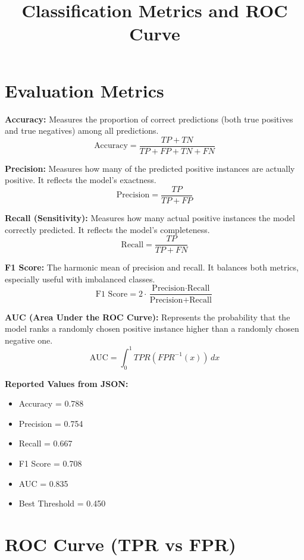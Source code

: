 \documentclass{article}
\title{Classification Metrics and ROC Curve}
\date{}
\begin{document}
\maketitle

\section*{Evaluation Metrics}

\textbf{Accuracy:}  
Measures the proportion of correct predictions (both true positives and true negatives) among all predictions.
\[
\text{Accuracy} = \frac{TP + TN}{TP + FP + TN + FN}
\]

\textbf{Precision:}  
Measures how many of the predicted positive instances are actually positive. It reflects the model’s exactness.
\[
\text{Precision} = \frac{TP}{TP + FP}
\]

\textbf{Recall (Sensitivity):}  
Measures how many actual positive instances the model correctly predicted. It reflects the model’s completeness.
\[
\text{Recall} = \frac{TP}{TP + FN}
\]

\textbf{F1 Score:}  
The harmonic mean of precision and recall. It balances both metrics, especially useful with imbalanced classes.
\[
\text{F1 Score} = 2 \cdot \frac{\text{Precision} \cdot \text{Recall}}{\text{Precision} + \text{Recall}}
\]

\textbf{AUC (Area Under the ROC Curve):}  
Represents the probability that the model ranks a randomly chosen positive instance higher than a randomly chosen negative one.
\[
\text{AUC} = \int_0^1 TPR(FPR^{-1}(x)) \, dx
\]

\vspace{1em}
\textbf{Reported Values from JSON:}
\begin{itemize}
    \item Accuracy = 0.788
    \item Precision = 0.754
    \item Recall = 0.667
    \item F1 Score = 0.708
    \item AUC = 0.835
    \item Best Threshold = 0.450
\end{itemize}

\section*{ROC Curve (TPR vs FPR)}
\end{document}

